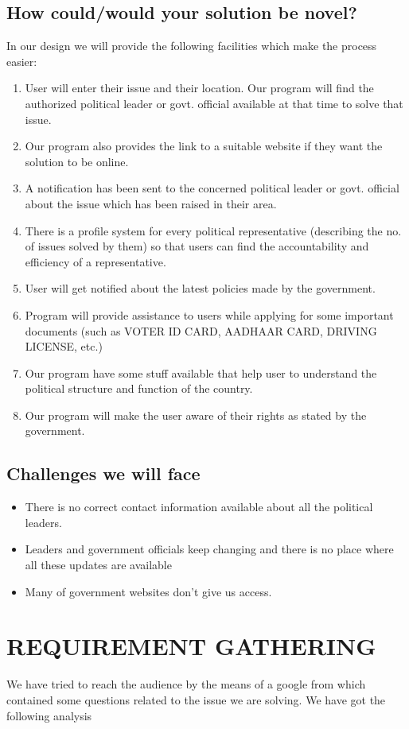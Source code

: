 \documentclass[acmtog]{acmart}
\begin{document}
\subsection{How could/would your solution be novel?}
In our design we will provide the following facilities which make the process easier:
\begin{enumerate}
    \item User will enter their issue and their location. Our program will find the authorized political leader or govt. official available at that time to solve that issue.
    \item Our program also provides the link to a suitable website if they want the solution to be online.
    \item A notification has been sent to the concerned political leader or govt. official about the issue which has been raised in their area.
    \item There is a profile system for every political representative (describing the no. of issues solved by them) so that users can find the accountability and efficiency of a representative.
    \item  User will get notified about the latest policies made by the government.
    \item Program will provide assistance to users while applying for some important documents (such as VOTER ID CARD, AADHAAR CARD, DRIVING LICENSE, etc.) 
    \item Our program have some stuff available that help user to understand the political structure and function of the country.
    \item Our program will make the user aware of their rights as stated by the government.
\end{enumerate}

\subsection{Challenges we will face}
\begin{itemize}
    \item There is no correct contact information available about all the political leaders.
    \item Leaders and government officials keep changing and there is no place where all these updates are available
    \item Many of government websites don’t give us access.
\end{itemize}

\section{REQUIREMENT GATHERING}
We have tried to reach the audience by the means of a google from which contained some questions related to the issue we are solving. We have got the following analysis
\end{document}
